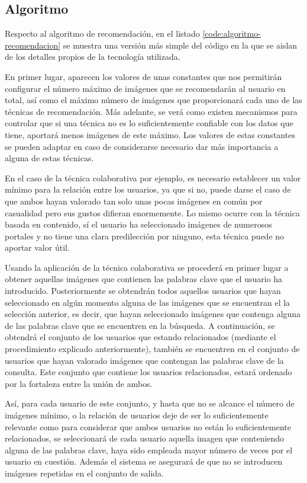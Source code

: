 \subsection{Algoritmo}

Respecto al algoritmo de recomendación, en el listado \ref{code:algoritmo-recomendacion} se muestra una versión más simple del código en la que se aislan de los detalles propios de la tecnología utilizada. 

En primer lugar, aparecen los valores de unas constantes que nos permitirán configurar el número máximo de imágenes que se recomendarán al usuario en total, así como el máximo número de imágenes que proporcionará cada uno de las técnicas de recomendación. Más adelante, se verá como existen mecanismos para controlar que si una técnica no es lo suficientemente confiable con los datos que tiene, aportará menos imágenes de este máximo. Los valores de estas constantes se pueden adaptar en caso de considerarse necesario dar más importancia a alguna de estas técnicas.

En el caso de la técnica colaborativa por ejemplo, es necesario establecer un valor mínimo para la relación entre los usuarios, ya que si no, puede darse el caso de que ambos hayan valorado tan solo unas pocas imágenes en común por casualidad pero sus gustos difieran enormemente. Lo mismo ocurre con la técnica basada en contenido, sí el usuario ha seleccionado imágenes de numerosos portales y no tiene una clara predilección por ninguno, esta técnica puede no aportar valor útil.

Usando la aplicación de la técnica colaborativa se procederá en primer lugar a obtener aquellas imágenes que contienen las palabras clave que el usuario ha introducido. Posteriormente se obtendrán todos aquellos usuarios que hayan seleccionado en algún momento alguna de las  imágenes que se encuentran el la selección anterior, es decir, que hayan seleccionado imágenes que contenga alguna de las palabras clave que se encuentren en la búsqueda. A continuación, se obtendrá el conjunto de los usuarios que estando relacionados (mediante el procedimiento explicado anteriormente), también se encuentren en el conjunto de usuarios que hayan valorado imágenes que contengan las palabras clave de la consulta. Este conjunto que contiene los usuarios relacionados, estará ordenado por la fortaleza entre la unión de ambos.

Así, para cada usuario de este conjunto, y hasta que no se alcance el número de imágenes mínimo, o la relación de usuarios deje de ser lo suficientemente relevante como para considerar que ambos usuarios no están lo suficientemente relacionados, se seleccionará de cada usuario aquella imagen que conteniendo alguna de las palabras clave, haya sido empleada mayor número de veces por el usuario en cuestión. Además el sistema se asegurará de que no se introducen imágenes repetidas en el conjunto de salida.\\


